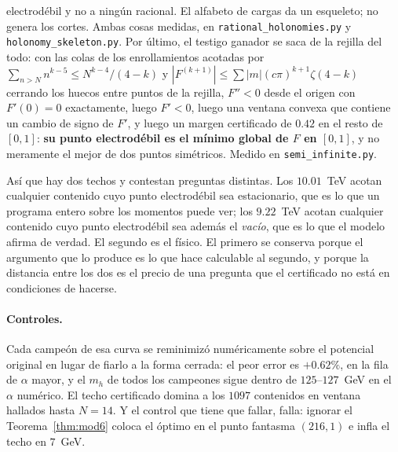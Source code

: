 \documentclass[11pt,a4paper]{article}
\begin{document}
electrodébil y no a ningún racional. El alfabeto de cargas da un esqueleto; no genera los cortes.
Ambas cosas medidas, en \texttt{rational\_\allowbreak holonomies.py} y
\texttt{holonomy\_\allowbreak skeleton.py}. Por
último, el testigo ganador se saca de la rejilla del todo: con las colas de los enrollamientos
acotadas por $\sum_{n>N}n^{k-5}\le N^{k-4}/(4-k)$ y $|F^{(k+1)}|\le\sum|m|(c\pi)^{k+1}\zeta(4-k)$
cerrando los huecos entre puntos de la rejilla, $F''<0$ desde el origen con $F'(0)=0$ exactamente,
luego $F'<0$, luego una ventana convexa que contiene un cambio de signo de $F'$, y luego un margen
certificado de $0.42$ en el resto de $[0,1]$: \textbf{su punto electrodébil es el mínimo global de
$F$ en $[0,1]$}, y no meramente el mejor de dos puntos simétricos. Medido en
\texttt{semi\_\allowbreak infinite.py}.

Así que hay dos techos y contestan preguntas distintas. Los $10.01$~TeV acotan cualquier contenido
cuyo punto electrodébil sea estacionario, que es lo que un programa entero sobre los momentos puede
ver; los $9.22$~TeV acotan cualquier contenido cuyo punto electrodébil sea además el \emph{vacío},
que es lo que el modelo afirma de verdad. El segundo es el físico. El primero se conserva porque el
argumento que lo produce es lo que hace calculable al segundo, y porque la distancia entre los dos
es el precio de una pregunta que el certificado no está en condiciones de hacerse.

\paragraph{Controles.} Cada campeón de esa curva se reminimizó numéricamente sobre el potencial
original en lugar de fiarlo a la forma cerrada: el peor error es $+0.62\%$, en la fila de $\alpha$
mayor, y el $m_h$ de todos los campeones sigue dentro de $125$--$127$~GeV en el $\alpha$ numérico. El
techo certificado domina a los $1097$ contenidos en ventana hallados hasta $N=14$. Y el control que
tiene que fallar, falla: ignorar el Teorema~\ref{thm:mod6} coloca el óptimo en el punto fantasma
$(216,1)$ e infla el techo en $7$~GeV.
\end{document}
